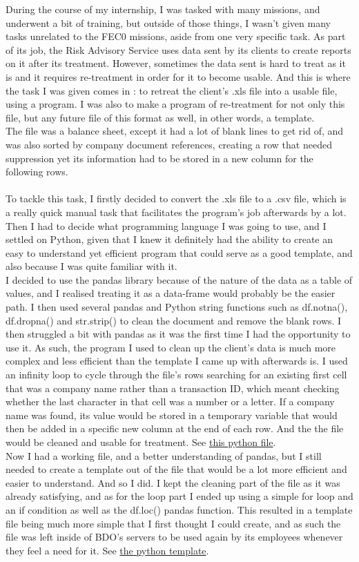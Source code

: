 \documentclass[12pt]{article}
\begin{document}
During the course of my internship, I was tasked with many missions, and underwent a bit of training, but outside of those things, I wasn't given many tasks unrelated to the FEC0 missions, aside from one very specific task. As part of its job, the Risk Advisory Service uses data sent by its clients to create reports on it after its treatment. However, sometimes the data sent is hard to treat as it is and it requires re-treatment in order for it to become usable. And this is where the task I was given comes in : to retreat the client's .xls file into a usable file, using a program. I was also to make a program of re-treatment for not only this file, but any future file of this format as well, in other words, a template. \\
The file was a balance sheet, except it had a lot of blank lines to get rid of, and was also sorted by company document references, creating a row that needed suppression yet its information had to be stored in a new column for the following rows. \\ \\
To tackle this task, I firstly decided to convert the .xls file to a .csv file, which is a really quick manual task that facilitates the program's job afterwards by a lot. Then I had to decide what programming language I was going to use, and I settled on Python, given that I knew it definitely had the ability to create an easy to understand yet efficient program that could serve as a good template, and also because I was quite familiar with it. \\
I decided to use the pandas library because of the nature of the data as a table of values, and I realised treating it as a data-frame would probably be the easier path. I then used several pandas and Python string functions such as df.notna(), df.dropna() and str.strip() to clean the document and remove the blank rows. I then struggled a bit with pandas as it was the first time I had the opportunity to use it. As such, the program I used to clean up the client's data is much more complex and less efficient than the template I came up with afterwards is. I used an infinity loop to cycle through the file's rows searching for an existing first cell that was a company name rather than a transaction ID, which meant checking whether the last character in that cell was a number or a letter. If a company name was found, its value would be stored in a temporary variable that would then be added in a specific new column at the end of each row. And the the file would be cleaned and usable for treatment. See \hyperref[py1]{this python file}. \\
Now I had a working file, and a better understanding of pandas, but I still needed to create a template out of the file that would be a lot more efficient and easier to understand. And so I did. I kept the cleaning part of the file as it was already satisfying, and as for the loop part I ended up using a simple for loop and an if condition as well as the df.loc() pandas function. This resulted in a template file being much more simple that I first thought I could create, and as such the file was left inside of BDO's servers to be used again by its employees whenever they feel a need for it. See \hyperref[py2]{the python template}.
\end{document}
